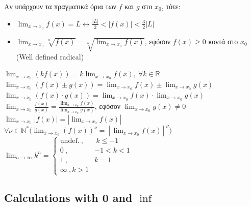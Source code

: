 \documentclass[12pt]{article}
\begin{document}
\begin{flushleft}
	\textbullet \quad \textgreek{Αν υπάρχουν τα πραγματικά όρια των} $f$ \textgreek{και} $g$ \textgreek{στο} $x_0$, \textgreek{τότε}: 
	\begin{itemize}
		\renewcommand{\labelitemi}{$\rightarrow$}
	\item $\displaystyle \lim_{x\to x_0} f(x) = L \leftrightarrow \frac{|L|}{2} < |f(x)| < \frac{3}{2} |L| $ \linebreak 
	\item $\displaystyle \lim_{x\to x_0} \sqrt[k]{f(x)} = \sqrt[k]{\lim_{x\to x_0} f(x)}$, \textgreek{εφόσον} $f(x) \geq 0$ \textgreek{κοντά στο} $x_0$ (Well defined radical)
	\end{itemize}
	\textbullet \quad $\displaystyle \lim_{x\to x_0} (k f(x)) = k\lim_{x\to x_0} f(x), \ \forall k \in \mathbb{R}$ \linebreak 
	\textbullet \quad $\displaystyle \lim_{x\to x_0} \left(f(x) \pm g(x)\right) = \lim_{x\to x_0} f(x) \pm \lim_{x\to x_0} g(x) $ \linebreak 
	\textbullet \quad $\displaystyle \lim_{x\to x_0} \left( f(x) \cdot g(x) \right) = \lim_{x\to x_0} f(x) \cdot \lim_{x\to x_0} g(x) $ \linebreak 
	\textbullet \quad $\displaystyle \lim_{x\to x_0} \frac{f(x)}{g(x)} = \frac{\lim_{x\to x_0} f(x)}{\lim_{x\to x_0} g(x)} $, \textgreek{εφόσον} $\lim_{x\to x_0} g(x) \neq 0$ \linebreak 
	\textbullet \quad $\displaystyle \lim_{x\to x_0} |f(x)| = |\lim_{x\to x_0} f(x)| $ \linebreak 
	\textbullet \quad $\displaystyle \forall \nu \in \mathbb{N}^* \big(\lim_{x\to x_0} (f(x))^{\nu} = \left[ \lim_{x\to x_0} f(x) \right]^{\nu} \big) $ \linebreak 
	\textbullet \quad $\displaystyle \lim_{n\to \infty}k^n = 
	\begin{cases} 
		\text{undef.}\ , & \ k\leq -1 \\ 
		0 \ , & -1 < k < 1 \\ 
		1\ , & k=1 \\ 
		\infty \ , k > 1
	 \end{cases} $ \linebreak 
	
	\subsection{Calculations with 0 and $\inf$}
	

\end{flushleft}
\end{document}
